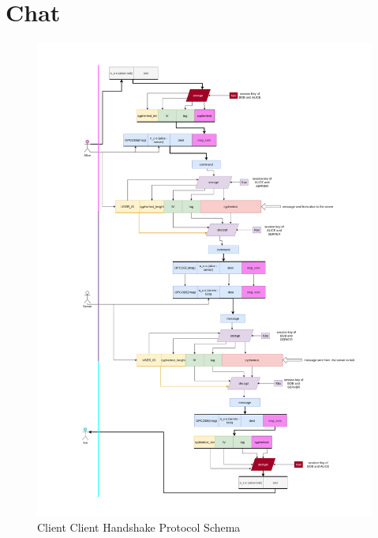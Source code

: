 \documentclass[11pt]{report}
\begin{document}
\section{Chat}
\begin{figure}[H]
	\centering
	\includegraphics[scale=0.09]{img/message_relay.png}
	\caption{Client Client Handshake Protocol Schema}
	\label {img: MessageRelay}
\end{figure}



	
	
		
\end{document}
